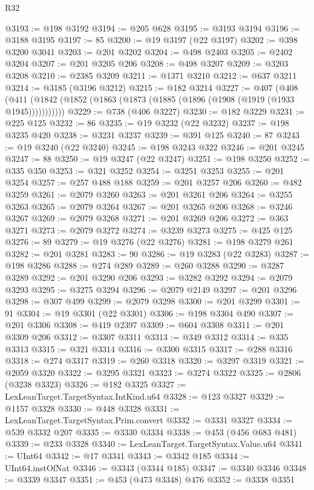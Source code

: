 \begin{lexlean}{R32}
\begin{coremodule}
@3193 := @198 @3192
@3194 := @205 @628
@3195 := @3193 @3194
@3196 := @3188 @3195
@3197 := 85
@3200 := @19 @3197 (@22 @3197)
@3202 := @398 @3200 @3041
@3203 := @201 @3202
@3204 := @498 @2403
@3205 := @2402 @3204
@3207 := @201 @3205 @206
@3208 := @498 @3207
@3209 := @3203 @3208
@3210 := @2385 @3209
@3211 := @1371 @3210
@3212 := @637 @3211
@3214 := @3185 (@3196 @3212)
@3215 := @182 @3214
@3227 := @407
    (@408 (@411 (@1842 (@1852 (@1863 (@1873 (@1885 (@1896 (@1908 (@1919 (@1933 @1945)))))))))))
@3229 := @738 (@406 @3227)
@3230 := @182 @3229
@3231 := @225 @125
@3232 := 86
@3235 := @19 @3232 (@22 @3232)
@3237 := @198 @3235 @420
@3238 := @3231 @3237
@3239 := @391 @125
@3240 := 87
@3243 := @19 @3240 (@22 @3240)
@3245 := @198 @3243 @322
@3246 := @201 @3245
@3247 := 88
@3250 := @19 @3247 (@22 @3247)
@3251 := @198 @3250
@3252 := @335 @350
@3253 := @321 @3252
@3254 := @3251 @3253
@3255 := @201 @3254
@3257 := @257 @488 @188
@3259 := @201 @3257 @206
@3260 := @482 @3259
@3261 := @2079 @3260
@3263 := @201 @3261 @206
@3264 := @3255 @3263
@3265 := @2079 @3264
@3267 := @201 @3265 @206
@3268 := @3246 @3267
@3269 := @2079 @3268
@3271 := @201 @3269 @206
@3272 := @363 @3271
@3273 := @2079 @3272
@3274 := @3239 @3273
@3275 := @425 @125
@3276 := 89
@3279 := @19 @3276 (@22 @3276)
@3281 := @198 @3279 @261
@3282 := @201 @3281
@3283 := 90
@3286 := @19 @3283 (@22 @3283)
@3287 := @198 @3286
@3288 := @274 @289
@3289 := @260 @3288
@3290 := @3287 @3289
@3292 := @201 @3290 @206
@3293 := @3282 @3292
@3294 := @2079 @3293
@3295 := @3275 @3294
@3296 := @2079 @2149
@3297 := @201 @3296
@3298 := @307 @499
@3299 := @2079 @3298
@3300 := @201 @3299
@3301 := 91
@3304 := @19 @3301 (@22 @3301)
@3306 := @198 @3304 @490
@3307 := @201 @3306
@3308 := @419 @2397
@3309 := @604 @3308
@3311 := @201 @3309 @206
@3312 := @3307 @3311
@3313 := @349 @3312
@3314 := @335 @3313
@3315 := @321 @3314
@3316 := @3300 @3315
@3317 := @288 @3316
@3318 := @274 @3317
@3319 := @260 @3318
@3320 := @3297 @3319
@3321 := @2059 @3320
@3322 := @3295 @3321
@3323 := @3274 @3322
@3325 := @2806 (@3238 @3323)
@3326 := @182 @3325
@3327 := LexLeanTarget.TargetSyntax.IntKind.u64
@3328 := @123 @3327
@3329 := @1157 @3328
@3330 := @448 @3328
@3331 := LexLeanTarget.TargetSyntax.Prim.convert
@3332 := @3331 @3327
@3334 := @539 @3332 @207
@3335 := @3330 @3334
@3338 := @453 (@456 @683 @481)
@3339 := @233 @3328
@3340 := LexLeanTarget.TargetSyntax.Value.u64
@3341 := UInt64
@3342 := @17 @3341
@3343 := @3342 @185
@3344 := UInt64.instOfNat
@3346 := @3343 (@3344 @185)
@3347 := @3340 @3346
@3348 := @3339 @3347
@3351 := @453 (@473 @3348) @476
@3352 := @3338 @3351

\end{coremodule}
\end{lexlean}
